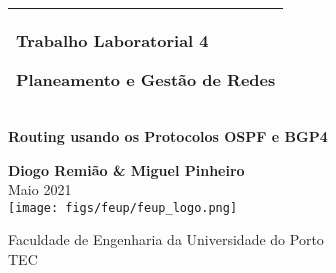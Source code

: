 %
%
%
%
%
\begin{titlepage}
  \addtolength{\hoffset}{0.5\evensidemargin-0.5\oddsidemargin} %
  \noindent%
  \begin{tabular}{@{}p{\textwidth}@{}}
    \toprule[2pt]
    \midrule
    \vspace{0.2cm}
    \begin{center}
    \Huge{\textbf{
        Trabalho Laboratorial 4 %
    }}
    \end{center}
    \begin{center}
      \Large{
        Planeamento e Gestão de Redes%
      }
    \end{center}
    \vspace{0.2cm}\\
    \midrule
    \toprule[2pt]
  \end{tabular}
  \vspace{2cm}
  \begin{center}
    \Huge{\textbf{
      Routing usando os Protocolos OSPF e BGP4   %
    }}
  \end{center}
  \vspace{1.5cm}
  \begin{center}
    {\Large
      \textbf{Diogo Remião \& Miguel Pinheiro} \\ %
      \vspace{0.2cm}
      {\Large
    Maio 2021  %
    }\\
      \vspace{1.5cm}
      \texttt{[image: figs/feup/feup\_logo.png]}
    }
  \end{center}
  \vfill
  \begin{center}
  \vspace{1.2cm}
  Faculdade de Engenharia da Universidade do Porto\\
  TEC
  \end{center}
\end{titlepage}
\clearpage
